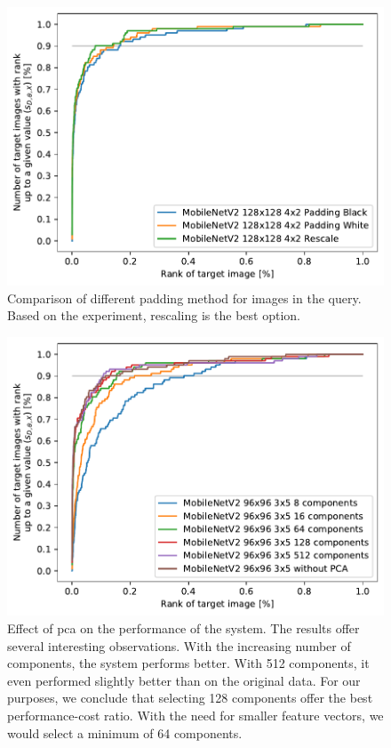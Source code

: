 \begin{figure}
    \centering
    \includegraphics[width=0.8\linewidth]{graphs/bf57efafbbbc7b5a1744054d87d4ecfa381c9eaf2459186904190d97bcb99a81.pdf}
    \caption[Comparison of different padding method for images in the query]{Comparison of different padding method for images in the query. Based on the experiment, rescaling is the best option.}
    \label{fig:padding}
\end{figure}

\begin{figure}
    \centering
    \includegraphics[width=0.8\linewidth]{graphs/6fbd4f70810e1f63f400ef601c1cdba0fd1635749810aa2347a4ff26e6fccf47.pdf}
    \caption[Effect of \acrshort{pca} on the performance of the system]{Effect of \acrshort{pca} on the performance of the system. The results offer several interesting observations. With the increasing number of components, the system performs better. With 512 components, it even performed slightly better than on the original data. For our purposes, we conclude that selecting 128 components offer the best performance-cost ratio. With the need for smaller feature vectors, we would select a minimum of 64 components.}
    \label{fig:pca}
\end{figure}

